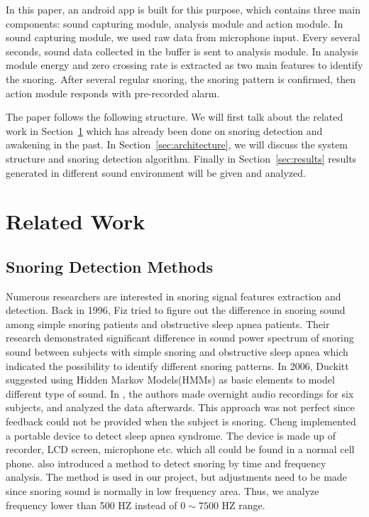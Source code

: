 \documentclass[conference]{IEEEtran}
\begin{document}
In this paper, an android app is built for this purpose, which contains three main components: sound capturing module, analysis module and action module. In sound capturing module, we used raw data from microphone input. Every several seconds, sound data collected in the buffer is sent to analysis module. In analysis module energy and zero crossing rate is extracted as two main features to identify the snoring. After several regular snoring, the snoring pattern is confirmed, then action module responds with pre-recorded alarm.

The paper follows the following structure. We will first talk about the related work in Section~\ref{sec:related_work} which has already been done on snoring detection and awakening in the past. In Section~\ref{sec:architecture}, we will discuss the system structure and snoring detection algorithm. Finally in Section~\ref{sec:results} results generated in different sound environment will be given and analyzed.
\section{Related Work} %
\label{sec:related_work}

\subsection{Snoring Detection Methods} %
\label{sub:snoring_detection_methods}

	Numerous researchers are interested in snoring signal features extraction and detection. Back in 1996, Fiz tried to figure out the difference in snoring sound among simple snoring patients and obstructive sleep apnea patients\cite{fiz1996acoustic}. Their research demonstrated significant difference in sound power spectrum of snoring sound between subjects with simple snoring and obstructive sleep apnea which indicated the possibility to identify different snoring patterns. In 2006, Duckitt\cite{duckitt2006automatic} suggested using Hidden Markov Models(HMMs) as basic elements to model different type of sound. In \cite{duckitt2006automatic}, the authors made overnight audio recordings for six subjects, and analyzed the data afterwards. This approach was not perfect since feedback could not be provided when the subject is snoring. Cheng\cite{cheng2008development} implemented a portable device to detect sleep apnea syndrome. The device is made up of recorder, LCD screen, microphone etc. which all could be found in a normal cell phone. \cite{ccavucsouglu2007efficient} also introduced a method to detect snoring by time and frequency analysis. The method is used in our project, but adjustments need to be made since snoring sound is normally in low frequency area\cite{pevernagie2010acoustics}\cite{calabrese2011system}. Thus, we analyze frequency lower than 500 HZ instead of $0\sim 7500$ HZ range. 
	
\end{document}
